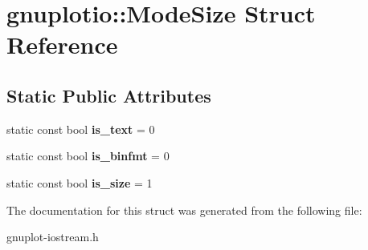 \hypertarget{structgnuplotio_1_1ModeSize}{}\section{gnuplotio\+:\+:Mode\+Size Struct Reference}
\label{structgnuplotio_1_1ModeSize}
\subsection*{Static Public Attributes}
\begin{DoxyCompactItemize}
\item 
\mbox{\label{structgnuplotio_1_1ModeSize_aa01840f76877ae7c8bad254dae28e32c}} 
static const bool {\bfseries is\+\_\+text} = 0
\item 
\mbox{\label{structgnuplotio_1_1ModeSize_ac5243e8e4910f2f6a2724b9fc0de4ff9}} 
static const bool {\bfseries is\+\_\+binfmt} = 0
\item 
\mbox{\label{structgnuplotio_1_1ModeSize_aa20ae9f1ce222504489db33d13eb46c0}} 
static const bool {\bfseries is\+\_\+size} = 1
\end{DoxyCompactItemize}


The documentation for this struct was generated from the following file\+:\begin{DoxyCompactItemize}
\item 
gnuplot-\/iostream.\+h\end{DoxyCompactItemize}
